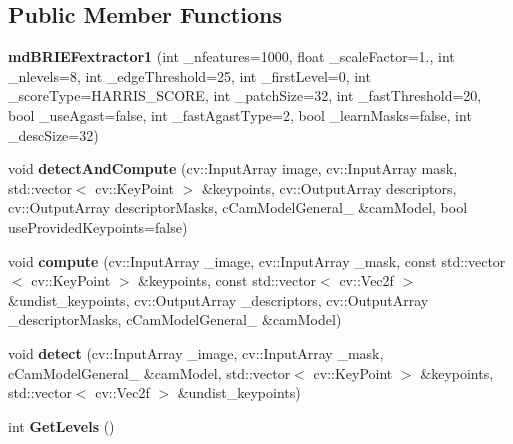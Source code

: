 \subsection*{Public Member Functions}
\begin{DoxyCompactItemize}
\item 
{\bfseries md\+B\+R\+I\+E\+Fextractor1} (int \+\_\+nfeatures=1000, float \+\_\+scale\+Factor=1., int \+\_\+nlevels=8, int \+\_\+edge\+Threshold=25, int \+\_\+first\+Level=0, int \+\_\+score\+Type=H\+A\+R\+R\+I\+S\+\_\+\+S\+C\+O\+RE, int \+\_\+patch\+Size=32, int \+\_\+fast\+Threshold=20, bool \+\_\+use\+Agast=false, int \+\_\+fast\+Agast\+Type=2, bool \+\_\+learn\+Masks=false, int \+\_\+desc\+Size=32)\hypertarget{classmdBRIEFextractor1_a205bde79556596526ae791c050f21ee8}{}\label{classmdBRIEFextractor1_a205bde79556596526ae791c050f21ee8}

\item 
void {\bfseries detect\+And\+Compute} (cv\+::\+Input\+Array image, cv\+::\+Input\+Array mask, std\+::vector$<$ cv\+::\+Key\+Point $>$ \&keypoints, cv\+::\+Output\+Array descriptors, cv\+::\+Output\+Array descriptor\+Masks, c\+Cam\+Model\+General\+\_\+ \&cam\+Model, bool use\+Provided\+Keypoints=false)\hypertarget{classmdBRIEFextractor1_aee118fb7a56b181f95be06a076d3a0fb}{}\label{classmdBRIEFextractor1_aee118fb7a56b181f95be06a076d3a0fb}

\item 
void {\bfseries compute} (cv\+::\+Input\+Array \+\_\+image, cv\+::\+Input\+Array \+\_\+mask, const std\+::vector$<$ cv\+::\+Key\+Point $>$ \&keypoints, const std\+::vector$<$ cv\+::\+Vec2f $>$ \&undist\+\_\+keypoints, cv\+::\+Output\+Array \+\_\+descriptors, cv\+::\+Output\+Array \+\_\+descriptor\+Masks, c\+Cam\+Model\+General\+\_\+ \&cam\+Model)\hypertarget{classmdBRIEFextractor1_ab76fa04826ab8276c668d8cb8dea68a5}{}\label{classmdBRIEFextractor1_ab76fa04826ab8276c668d8cb8dea68a5}

\item 
void {\bfseries detect} (cv\+::\+Input\+Array \+\_\+image, cv\+::\+Input\+Array \+\_\+mask, c\+Cam\+Model\+General\+\_\+ \&cam\+Model, std\+::vector$<$ cv\+::\+Key\+Point $>$ \&keypoints, std\+::vector$<$ cv\+::\+Vec2f $>$ \&undist\+\_\+keypoints)\hypertarget{classmdBRIEFextractor1_add5de740eca42464aa7e6a045f0407cc}{}\label{classmdBRIEFextractor1_add5de740eca42464aa7e6a045f0407cc}

\item 
int {\bfseries Get\+Levels} ()\hypertarget{classmdBRIEFextractor1_aef1fb456c93c569eab3d7bd5fb2e6517}{}\label{classmdBRIEFextractor1_aef1fb456c93c569eab3d7bd5fb2e6517}


\end{DoxyCompactItemize}
